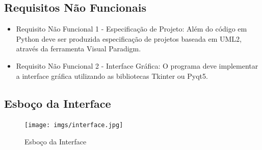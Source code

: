 \documentclass{article}
\begin{document}
\subsection{Requisitos Não Funcionais}
    \begin{itemize}
        \item Requisito Não Funcional 1 - Especificação de Projeto: 
    Além do código em Python deve ser produzida especificação de projetos baseada em UML2, através da ferramenta Visual Paradigm.
    
        \item Requisito Não Funcional 2 - Interface Gráfica:
    O programa deve implementar a interface gráfica utilizando as bibliotecas Tkinter ou Pyqt5.
    \end{itemize}

\subsection{Esboço da Interface}

    \begin{figure}[h]
    \centering
    \texttt{[image: imgs/interface.jpg]}
    \caption{Esboço da Interface}
    \label{figura:interface}
    \end{figure}
    

    
\end{document}

